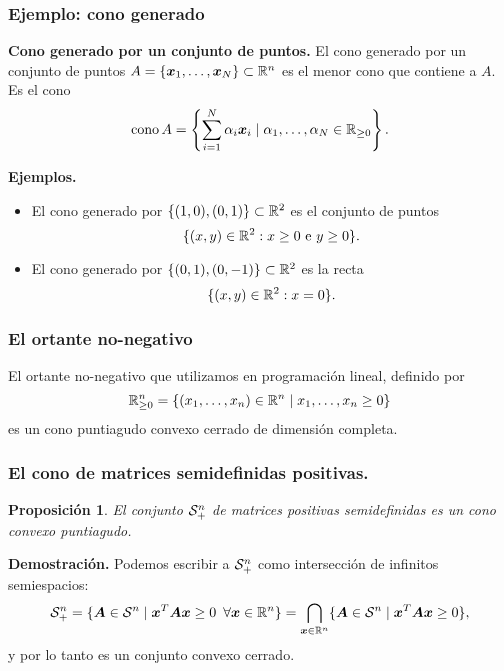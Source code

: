 \documentclass[aspectratio=169,12pt,spanish]{beamer}
\newtheorem{proposition}[theorem]{Proposición}
\begin{document}

\begin{frame}
\frametitle{Ejemplo: cono generado}

\noindent\textbf{Cono generado por un conjunto de puntos.}
El cono generado por un conjunto de puntos $A = \{\bm{x}_1, \dots, \bm{x}_N\} \subset \mathbb{R}^n$ es el menor cono que contiene a $A$. Es el cono
$$
\operatorname{cono} A = \left\{ \sum_{i=1}^N \alpha_i \bm{x}_i \mid \alpha_1, \dots, \alpha_N \in \mathbb{R}_{\ge 0}\right\}.
$$

\textbf{Ejemplos.}
\begin{itemize}
\item El cono generado por $\{(1,0), (0,1)\} \subset \mathbb{R}^2$ es el conjunto de puntos $$\{(x,y) \in \mathbb{R}^2: x\ge 0 \text{ e } y \ge 0\}.$$
\item El cono generado por $\{(0,1), (0, -1)\} \subset \mathbb{R}^2$ es la recta $$\{(x,y) \in \mathbb{R}^2: x = 0\}.$$
\end{itemize}


\end{frame}


\begin{frame}
\frametitle{El ortante no-negativo}

El ortante no-negativo que utilizamos en programación lineal, definido por
$$
\mathbb{R}^n_{\ge 0} = \{(x_1, \dots, x_n) \in \mathbb{R}^n \mid x_1, \dots, x_n \ge 0\}
$$
es un cono puntiagudo convexo cerrado de dimensión completa.

\end{frame}


\begin{frame}
\frametitle{El cono de matrices semidefinidas positivas.}

\begin{proposition}
El conjunto ${\mathcal S_+^n}$ de matrices positivas semidefinidas es un cono convexo puntiagudo.
\end{proposition}


\textbf{Demostración.}
Podemos escribir a ${\mathcal S_+^n}$ como intersección de infinitos semiespacios:
$$
{\mathcal S_+^n} = \{\bm{A} \in {\mathcal S^n} \mid \bm{x}^T \bm{A} \bm{x} \ge 0 \enspace \forall \bm{x} \in \mathbb{R}^n\} = \bigcap_{\bm{x}\in\mathbb{R}^n} \{\bm{A} \in {\mathcal S^n} \mid \bm{x}^T \bm{A} \bm{x} \ge 0\},
$$
y por lo tanto es un conjunto convexo cerrado.

\end{frame}
\end{document}
